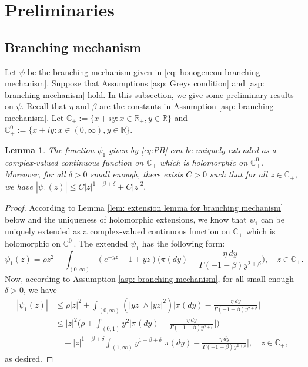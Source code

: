 \documentclass[12pt,a4paper]{amsart}
\theoremstyle{plain}
\newtheorem{lem}[thm]{Lemma}
\theoremstyle{definition}
\numberwithin{equation}{section}
\begin{document}
\section{Preliminaries}
\subsection{Branching mechanism}
\label{sec: branching mechanism}
Let $\psi$ be the branching mechanism given in \eqref{eq: honogeneou branching mechanism}.
Suppose that Assumptions \ref{asp: Greys condition} and \ref{asp: branching mechanism} hold.
In this subsection, we give some preliminary results on $\psi$.
Recall that $\eta$ and $\beta$ are the constants in Assumption \ref{asp: branching mechanism}.
Let $\mathbb C_+:= \{x+iy: x\in \mathbb R_+, y \in \mathbb R\}$ and $\mathbb C^0_+:= \{x+iy: x\in (0,\infty), y \in \mathbb R\}$.
\begin{lem}
  \label{lem:CEP}
	The function $\psi_1$ given by \eqref{eq:PB} can be uniquely extended as a complex-valued continuous function on $\mathbb C_+$ which is holomorphic on $\mathbb C^0_+$.
  Moreover, for all $\delta > 0$ small enough, there exists $C>0$ such that for all $z\in \mathbb C_+$, we have $|\psi_1(z)| \leq C |z|^{1+\beta+\delta} + C|z|^2.$
\end{lem}
\begin{proof}
  According to Lemma \ref{lem: extension lemma for branching mechanism} below and the uniqueness of holomorphic extensions, we know that $\psi_1$ can be uniquely extended as a complex-valued continuous function on $\mathbb C_+$ which is holomorphic on $\mathbb C^0_+$.
	The extended $\psi_1$ has the following form:
  \[
    \psi_1(z)
    = \rho z^2 + \int_{(0,\infty)}(e^{-yz}-1+yz) \Big(\pi(dy) - \frac {\eta~dy} {\Gamma(-1-\beta)y^{2+\beta}} \Big)
    , \quad z\in \mathbb C_+.
  \]
	Now, according to  Assumption \ref{asp: branching mechanism}, for all small enough $\delta > 0$, we have
  \begin{align}
    |\psi_1(z)|
    & \leq \rho |z|^2 + \int_{(0,\infty)} (|yz|\wedge |yz|^2) \Big|\pi(dy) - \frac{\eta~dy}{\Gamma(-1-\beta)y^{2+\beta}}\Big| \\
    & \leq  |z|^2 \Big(\rho + \int_{(0,1)} y^2 \Big|\pi(dy) - \frac{\eta~dy}{\Gamma(-1-\beta)y^{2+\beta}}\Big|\Big) \\
    & \quad + |z|^{1+\beta +\delta}\int_{(1,\infty)} y^{1+\beta + \delta} \Big|\pi(dy) - \frac{\eta~dy}{\Gamma(-1-\beta)y^{2+\beta}}\Big|,
      \quad z \in \mathbb C_+,
  \end{align}
	as desired.
\end{proof}
\end{document}
